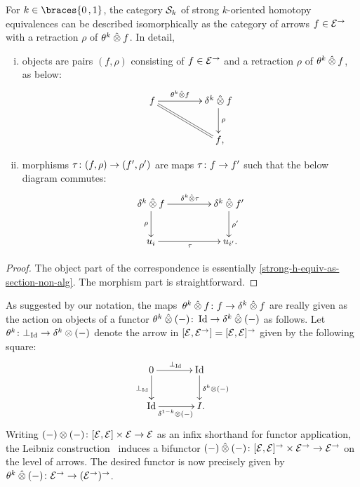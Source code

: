 \documentclass[reqno,10pt,a4paper,oneside,draft]{amsart}
\begin{document}
{{\begin{lemma} \label{strong-h-equiv-as-section}
For $k \in \braces{0\,, 1}$, the category $\cal{S}_k$ of strong $k$-oriented homotopy equivalences can be described isomorphically as the category of arrows $f \in \catE^{\to}$ with a retraction $\rho$ of $\thetak \hatotimes f$.
In detail,
\begin{enumerate}[(i)]
\item objects are pairs $(f, \rho)$ consisting of $f \in \catE^\to$ and a retraction $\rho$ of $\thetak \hatotimes f$, as below:
\[
\xymatrix@C+2em{
  f
  \ar[r]^-{\thetak \hatotimes f}
  \ar@{=}[dr]
&
  \kcyl \hatotimes f \ar[d]^{\rho}
\\&
  f
\rlap{,}}
\]
\item morphisms $\tau \co (f, \rho) \to (f', \rho')$ are maps $\tau \co f \to f'$ such that the below diagram commutes:
\[
\xymatrix@C+2em{
  \kcyl \hatotimes f
  \ar[d]_-{\rho}
  \ar[r]^{\kcyl \hatotimes \tau}
&
 \kcyl \hatotimes f'
  \ar[d]^-{\rho'}
\\
  u_i
  \ar[r]_{\tau}
&
  u_{i'}
\rlap{.}}
\]
\end{enumerate}
\end{lemma}

\begin{proof}
The object part of the correspondence is essentially \cref{strong-h-equiv-as-section-non-alg}.
The morphism part is straightforward.
\end{proof}

\begin{remark} \label{theta}
As suggested by our notation, the maps~$\thetak \hatotimes f \co f \to \kcyl \hatotimes f$ are really given as the action on objects of a functor $\thetak \hatotimes (-) \co \Id \to \delta^k \hatotimes (-)$ as follows.
Let $\theta^k \co \bot_{\Id} \to \delta^k \otimes (-)$ denote the arrow in $[\cal{E}, \cal{E}^\to] = [\cal{E}, \cal{E}]^\to$ given by the following square:
\[
\xymatrix@C+1em{
  0
  \ar[r]^{\bot_{\Id}}
  \ar[d]_{\bot_{\Id}}
&
  \Id
  \ar[d]^{\delta^k \otimes (-)}
\\
  \Id
  \ar[r]_{\delta^{1-k} \otimes (-)}
&
  I
\rlap{.}}
\]
Writing $(-) \otimes (-) \co [\cal{E}, \cal{E}] \times \cal{E} \to \cal{E}$ as an infix shorthand for functor application, the Leibniz construction~\cite{riehl-verity:reedy} induces a bifunctor $(-) \hatotimes (-) \co [\cal{E}, \cal{E}]^\to \times \cal{E}^\to \to \cal{E}^\to$ on the level of arrows.
The desired functor is now precisely given by $\theta^k \hatotimes (-) \co \cal{E}^\to \to (\cal{E}^\to)^\to$.
\end{remark}

}}
\end{document}
